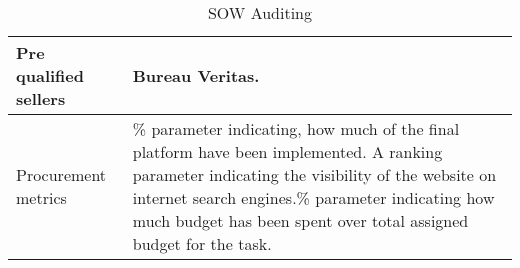 \begin{table}[H]
\begin{tabular}{>{\raggedright\arraybackslash}p{3cm} >{\arraybackslash}p{11cm}}
		\midrule
		
		Pre qualified sellers & Bureau Veritas.\vspace{0.2cm} \\
		
		\midrule
		
		Procurement metrics & \% parameter indicating, how much of the final platform have been implemented. A ranking parameter indicating the visibility of the website on internet search engines.\% parameter indicating how much budget has been spent over total assigned budget for the task.\vspace{0.2cm} \\
		
		\bottomrule[2pt]		
		
	\end{tabular}
	\caption{SOW Auditing}
\end{table}